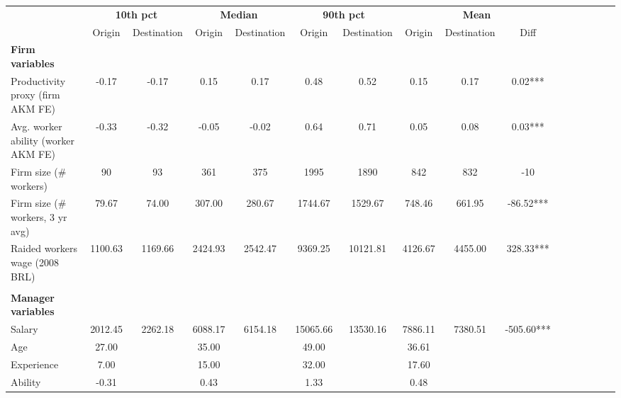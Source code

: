 {
\def\sym#1{\ifmmode^{#1}\else\(^{#1}\)\fi}
\begin{tabular}{l*{5}{ccc}}
\toprule
                    &\multicolumn{2}{c}{\textbf{10th pct}}&\multicolumn{2}{c}{\textbf{Median}}&\multicolumn{2}{c}{\textbf{90th pct}}&\multicolumn{3}{c}{\textbf{Mean}}        \\\cmidrule(lr){2-3}\cmidrule(lr){4-5}\cmidrule(lr){6-7}\cmidrule(lr){8-10}
                    &      Origin& Destination&      Origin& Destination&      Origin& Destination&      Origin& Destination&        Diff   \\
\midrule
\textbf{Firm variables}&            &            &            &            &            &            &            &            &               \\
Productivity proxy (firm AKM FE)&       -0.17&       -0.17&        0.15&        0.17&        0.48&        0.52&        0.15&        0.17&        0.02***\\
Avg. worker ability (worker AKM FE)&       -0.33&       -0.32&       -0.05&       -0.02&        0.64&        0.71&        0.05&        0.08&        0.03***\\
Firm size (\# workers)&          90&          93&         361&         375&        1995&        1890&         842&         832&         -10   \\
Firm size (\# workers, 3 yr avg)&       79.67&       74.00&      307.00&      280.67&     1744.67&     1529.67&      748.46&      661.95&      -86.52***\\
Raided workers wage (2008 BRL)&     1100.63&     1169.66&     2424.93&     2542.47&     9369.25&    10121.81&     4126.67&     4455.00&      328.33***\\
\\ \textbf{Manager variables}&            &            &            &            &            &            &            &            &               \\
Salary              &     2012.45&     2262.18&     6088.17&     6154.18&    15065.66&    13530.16&     7886.11&     7380.51&     -505.60***\\
Age                 &       27.00&            &       35.00&            &       49.00&            &       36.61&            &               \\
Experience          &        7.00&            &       15.00&            &       32.00&            &       17.60&            &               \\
Ability             &       -0.31&            &        0.43&            &        1.33&            &        0.48&            &               \\

\end{tabular}}

